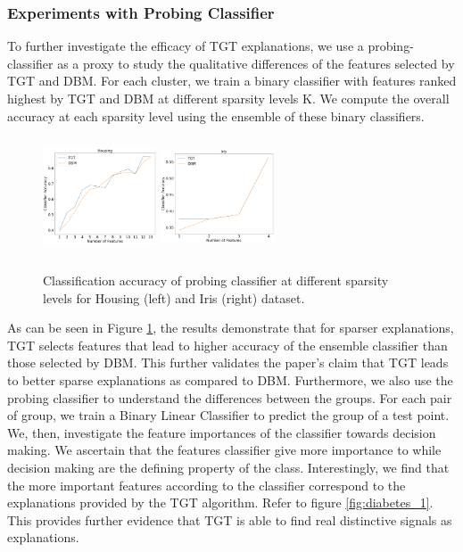 \subsubsection{Experiments with Probing Classifier}
To further investigate the efficacy of TGT explanations, we use a probing-classifier \cite{belinkov-etal-2020-interpretability} as a proxy to study the qualitative differences of the features selected by TGT and DBM. For each cluster, we train a binary classifier with features ranked highest by TGT and DBM at different sparsity levels K. We compute the overall accuracy at each sparsity level using the ensemble of these binary classifiers.
\begin{figure}
\centering
    \includegraphics[width=0.3\textwidth, height=3.5cm]{../openreview/images/tffigures/housing-classification-2.png}
    \includegraphics[width=0.3\textwidth, height=3.5cm]{../openreview/images/tffigures/iris-classification-2.png}
    \caption{Classification accuracy of probing classifier at different sparsity levels for Housing (left) and Iris (right) dataset.}
    \label{fig:classification}
\end{figure}
As can be seen in Figure \ref{fig:classification}, the results demonstrate that for sparser explanations, TGT selects features that lead to higher accuracy of the ensemble classifier than those selected by DBM. This further validates the paper’s claim that TGT leads to better sparse explanations as compared to DBM.
Furthermore, we also use the probing classifier to understand the differences between the groups. For each pair of group, we train a Binary Linear Classifier to predict the group of a test point. We, then, investigate the feature importances of the classifier towards decision making. We ascertain that the features classifier give more importance to while decision making are the defining property of the class. Interestingly, we find that the more important features according to the classifier correspond to the explanations provided by the TGT algorithm. Refer to figure \ref{fig:diabetes_1}. This provides further evidence that TGT is able to find real distinctive signals as explanations.



